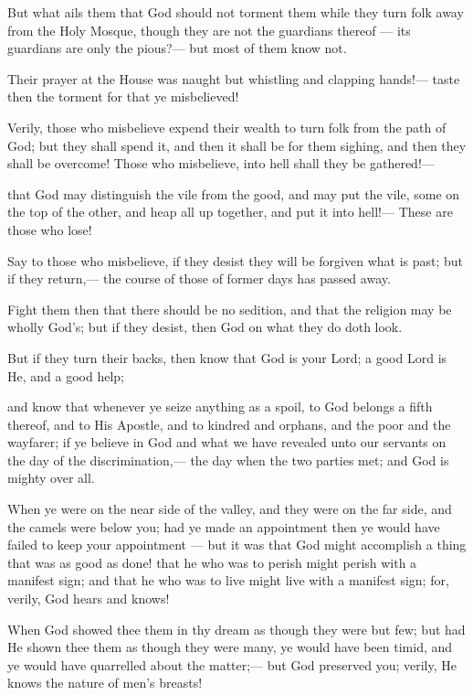 \documentclass[fontsize=14pt, letterpaper, notitlepage, openany, DIV=12]{scrbook} %
\begin{document}
\noindent[8:34]
But what ails them that God should not torment them while they turn folk away from the
Holy Mosque, though they are not the guardians thereof --- its guardians are only the pious?---
but most of them know not.

\noindent[8:35]
Their prayer at the House was naught but whistling and clapping hands!--- taste then the
torment for that ye misbelieved!

\noindent[8:36]
Verily, those who misbelieve expend their wealth to turn folk from the path of God; but
they shall spend it, and then it shall be for them sighing, and then they shall be overcome! Those
who misbelieve, into hell shall they be gathered!---

\noindent[8:37]
that God may distinguish the vile from the good, and may put the vile, some on the top of
the other, and heap all up together, and put it into hell!--- These are those who lose!

\noindent[8:38]
Say to those who misbelieve, if they desist they will be forgiven what is past; but if they
return,--- the course of those of former days has passed away.

\noindent[8:39]
Fight them then that there should be no sedition, and that the religion may be wholly
God's; but if they desist, then God on what they do doth look.

\noindent[8:40]
But if they turn their backs, then know that God is your Lord; a good Lord is He, and a
good help;

\noindent[8:41]
and know that whenever ye seize anything as a spoil, to God belongs a fifth thereof, and
to His Apostle, and to kindred and orphans, and the poor and the wayfarer; if ye believe in God
and what we have revealed unto our servants on the day of the discrimination,--- the day when
the two parties met; and God is mighty over all.

\noindent[8:42]
When ye were on the near side of the valley, and they were on the far side, and the
camels were below you; had ye made an appointment then ye would have failed to keep your
appointment --- but it was that God might accomplish a thing that was as good as done! that he
who was to perish might perish with a manifest sign; and that he who was to live might live with
a manifest sign; for, verily, God hears and knows!

\noindent[8:43]
When God showed thee them in thy dream as though they were but few; but had He
shown thee them as though they were many, ye would have been timid, and ye would have
quarrelled about the matter;--- but God preserved you; verily, He knows the nature of men's
breasts!
\end{document}
